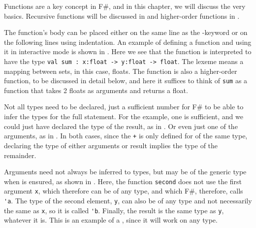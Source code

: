 \documentclass[fsharpNotes.tex]{subfiles}
\begin{document}
Functions are a key concept in F\#, and in this chapter, we will discuss the very basics. Recursive functions will be discussed in  and higher-order functions in .

The function's body can be placed either on the same line as the -keyword or on the following lines using indentation. An example of defining a function and using it in interactive mode is shown in .
%
%
Here we see that the function is interpreted to have the type \lstinline!val sum : x:float -> y:float -> float!. The \lexeme{->} lexeme means a mapping between sets, in this case, floats. The function is also a higher-order function, to be discussed in detail below, and here it suffices to think of \lstinline!sum! as a function that takes 2 floats as arguments and returns a float.

Not all types need to be declared, just a sufficient number for F\# to be able to infer the types for the full statement. For the example, one is sufficient, and we could just have declared the type of the result, as in .
%
%
Or even just one of the arguments, as in .
%
%
In both cases, since the \lstinline|+|  is only defined for  of the same type, declaring the type of either arguments or result implies the type of the remainder.

Arguments need not always be inferred to types, but may be of the generic type when  is ensured, as shown in .
%
%
Here, the function \lstinline{second} does not use the first argument \lstinline{x}, which therefore can be of any type, and which F\#, therefore, calls \lstinline{'a}. The type of the second element, \lstinline{y}, can also be of any type and not necessarily the same as \lstinline!x!, so it is called \lstinline!'b!. Finally, the result is the same type as \lstinline!y!, whatever it is. This is an example of a , since it will work on any type.
\end{document}
